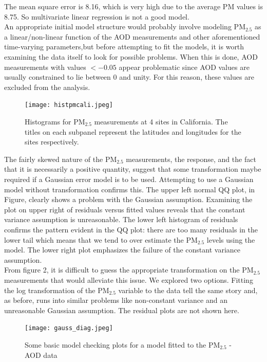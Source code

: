 \documentclass[10pt]{article}
\def\PM{{\mathrm{PM_{2.5}}}}
\begin{document}
The mean square error is 8.16, which is very high due to the average PM values is 8.75. So multivariate linear regression is not a good model. \\
An appropriate initial model structure would probably involve modeling $\PM$ as a linear/non-linear function of the AOD measurements and other aforementioned time-varying parameters,but before attempting to fit the models, it is worth examining the data itself to look for possible problems. When this is done, AOD measurements with values $< -0.05$ appear problematic since AOD values are usually constrained to lie between 0 and unity. For this reason, these values are excluded from the analysis. \\ 

\begin{figure}[H]
\centering
\texttt{[image: histpmcali.jpeg]}
\caption{Histograms for $\PM$ measurements at 4 sites in California. The titles on each subpanel represent the latitudes and longitudes for the sites respectively.}
\end{figure}

The fairly skewed nature of the $\PM$ measurements, the response, and the fact that it is necessarily a positive quantity, suggest that some transformation maybe required if a Gaussian error model is to be used. Attempting to use a Gaussian model without transformation confirms this. The upper left normal QQ plot, in Figure, clearly shows a problem with the Gaussian assumption. Examining the plot on upper right of residuals versus fitted values reveals that the constant variance assumption is unreasonable. The lower left histogram of residuals confirms the pattern evident in the QQ plot: there are too many residuals in the lower tail which means that we tend to over estimate the $\PM$ levels using the model. The lower right plot emphasizes the failure of the constant variance assumption. \\ From figure 2, it is difficult to guess the appropriate transformation on the $\PM$ measurements that would alleviate this issue. We explored two options. Fitting the log transformation of the $\PM$ variable to the data tell the same story and, as before, runs into similar problems like non-constant variance and an unreasonable Gaussian assumption. The residual plots are not shown here.

\begin{figure}[H]
\centering
\texttt{[image: gauss\_diag.jpeg]} 
\caption{Some basic model checking plots for a model fitted to the $\PM$ - AOD data} 
\end{figure}
\end{document}
